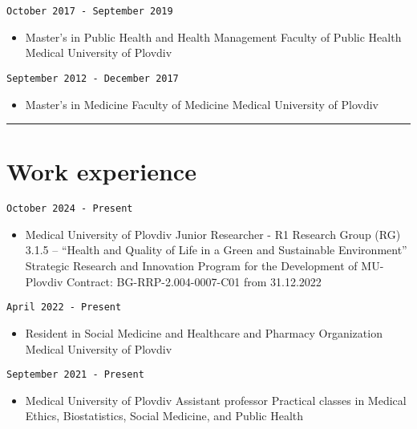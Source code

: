 \documentclass[
  12pt,
  letterpaper,
  DIV=11,
  numbers=noendperiod]{scrartcl}
\providecommand{\tightlist}{%
  \setlength{\itemsep}{0pt}\setlength{\parskip}{0pt}}\usepackage{longtable,booktabs,array}
\begin{document}
\texttt{October\ 2017\ -\ September\ 2019}

\begin{itemize}
\tightlist
\item
  Master's in Public Health and Health Management \textbar{} Faculty of
  Public Health \textbar{} Medical University of Plovdiv
\end{itemize}

\texttt{September\ 2012\ -\ December\ 2017}

\begin{itemize}
\tightlist
\item
  Master's in Medicine \textbar{} Faculty of Medicine \textbar{} Medical
  University of Plovdiv
\end{itemize}

\begin{center}\rule{0.5\linewidth}{0.5pt}\end{center}

\section{Work experience}\label{work-experience}

\texttt{October\ 2024\ -\ Present}

\begin{itemize}
\tightlist
\item
  Medical University of Plovdiv \textbar{} Junior Researcher - R1
  \textbar{} Research Group (RG) 3.1.5 -- ``Health and Quality of Life
  in a Green and Sustainable Environment'' \textbar{} Strategic Research
  and Innovation Program for the Development of MU-Plovdiv \textbar{}
  Contract: BG-RRP-2.004-0007-C01 from 31.12.2022
\end{itemize}

\texttt{April\ 2022\ -\ Present}

\begin{itemize}
\tightlist
\item
  Resident in Social Medicine and Healthcare and Pharmacy Organization
  \textbar{} Medical University of Plovdiv
\end{itemize}

\texttt{September\ 2021\ -\ Present}

\begin{itemize}
\tightlist
\item
  Medical University of Plovdiv \textbar{} Assistant professor
  \textbar{} Practical classes in Medical Ethics, Biostatistics, Social
  Medicine, and Public Health
\end{itemize}
\end{document}
